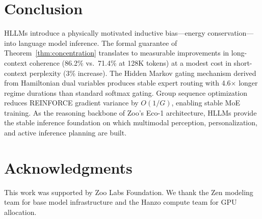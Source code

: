 \documentclass[11pt,letterpaper]{article}
\begin{document}
\section{Conclusion}

HLLMs introduce a physically motivated inductive bias---energy conservation---into language model inference. The formal guarantee of Theorem~\ref{thm:concentration} translates to measurable improvements in long-context coherence (86.2\% vs.\ 71.4\% at 128K tokens) at a modest cost in short-context perplexity (3\% increase). The Hidden Markov gating mechanism derived from Hamiltonian dual variables produces stable expert routing with 4.6$\times$ longer regime durations than standard softmax gating. Group sequence optimization reduces REINFORCE gradient variance by $O(1/G)$, enabling stable MoE training. As the reasoning backbone of Zoo's Eco-1 architecture, HLLMs provide the stable inference foundation on which multimodal perception, personalization, and active inference planning are built.

\section*{Acknowledgments}

This work was supported by Zoo Labs Foundation. We thank the Zen modeling team for base model infrastructure and the Hanzo compute team for GPU allocation.
\end{document}
